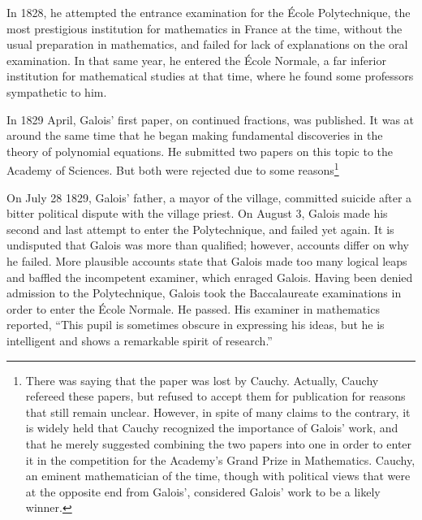 \documentclass{article}
\begin{document}
In 1828, he attempted the entrance examination for the École Polytechnique, the most prestigious institution for mathematics in France at the time, without the usual preparation in mathematics, and failed for lack of explanations on the oral examination. In that same year, he entered the École Normale, a far inferior institution for mathematical studies at that time, where he found some professors sympathetic to him.

In 1829 April, Galois' first paper, on continued fractions, was published. It was at around the same time that he began making fundamental discoveries in the theory of polynomial equations. He submitted two papers on this topic to the Academy of Sciences. But both were rejected due to some reasons\footnote{There was saying that the paper was lost by Cauchy. Actually, Cauchy refereed these papers, but refused to accept them for publication for reasons that still remain unclear. However, in spite of many claims to the contrary, it is widely held that Cauchy recognized the importance of Galois' work, and that he merely suggested combining the two papers into one in order to enter it in the competition for the Academy's Grand Prize in Mathematics. Cauchy, an eminent mathematician of the time, though with political views that were at the opposite end from Galois', considered Galois' work to be a likely winner\cite{Wiki-Galois}.}

On July 28 1829, Galois' father, a mayor of the village, committed suicide after a bitter political dispute with the village priest\cite{Wiki-Galois}. On August 3, Galois made his second and last attempt to enter the Polytechnique, and failed yet again. It is undisputed that Galois was more than qualified; however, accounts differ on why he failed. More plausible accounts state that Galois made too many logical leaps and baffled the incompetent examiner, which enraged Galois. Having been denied admission to the Polytechnique, Galois took the Baccalaureate examinations in order to enter the École Normale. He passed. His examiner in mathematics reported, ``This pupil is sometimes obscure in expressing his ideas, but he is intelligent and shows a remarkable spirit of research.''
\end{document}
